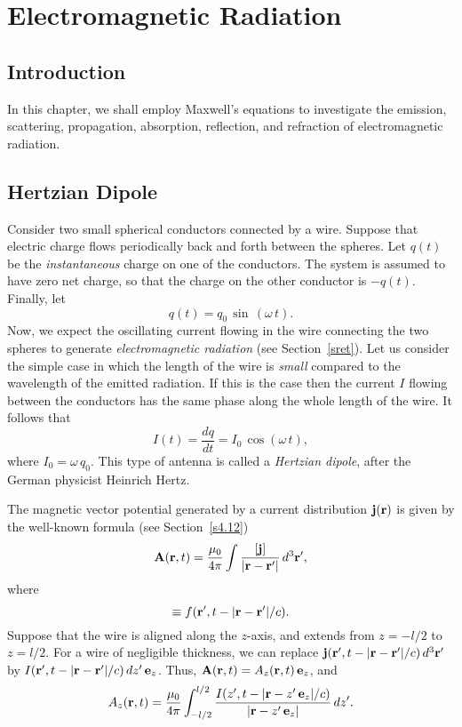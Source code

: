 \chapter{Electromagnetic Radiation}\label{waves}
\section{Introduction}
In this chapter, we shall employ Maxwell's equations to investigate
the emission, scattering, propagation, absorption, reflection, and refraction of electromagnetic radiation.

\section{Hertzian Dipole}\label{s9.1}
Consider two small spherical conductors connected by a wire. Suppose that  electric
charge flows periodically back and forth between the spheres. Let $q(t)$ be the {\em instantaneous} charge on
one of the conductors. The system is assumed to have zero net charge, so that 
the charge on the other conductor is $-q(t)$. Finally, let
\begin{equation} 
q(t) = q_0\, \sin \,(\omega\, t).
\end{equation}
Now, we expect the oscillating current flowing in the wire connecting the two spheres to
generate {\em electromagnetic radiation}\/ (see Section~\ref{sret}). Let us consider the simple
case in which the length of the wire is {\em small}\/ compared to the wavelength of the emitted
radiation. If this is the case then the current $I$ flowing between the conductors has the
same phase along the whole length of the wire. It  follows that
\begin{equation}
I(t) = \frac{dq}{dt} = I_0\, \cos(\omega\, t),
\end{equation}
where $I_0 = \omega \,q_0$. This type of antenna is called a {\em Hertzian dipole}, after
the German physicist Heinrich Hertz.

The magnetic vector potential generated by a current distribution ${\bf j}({\bf r})$ is given by
the well-known formula (see Section~\ref{s4.12})
\begin{equation}
{\bf A}({\bf r}, t) = \frac{\mu_0}{4\pi} \int \frac{[{\bf j}]}{|{\bf r} - {\bf r}'|}\,
d^3{\bf r}',
\end{equation}
where
\begin{equation}
[f] \equiv f({\bf r}', t - |{\bf r} - {\bf r}'|/c).
\end{equation}
Suppose that the wire is aligned along the $z$-axis, and extends from $z=-l/2$ to $z=l/2$. 
For a wire of negligible thickness, we can replace ${\bf  j}({\bf r}', t- |{\bf r} - {\bf r}'|/c)
\,d^3{\bf r}'$ by $I({\bf r}', t - |{\bf r} - {\bf r}'|/c)\,dz' \,{\bf e}_z$. 
Thus, ${\bf A}({\bf r}, t) = A_z({\bf r}, t)\, {\bf e}_z$, and
\begin{equation}
A_z ({\bf r}, t) = \frac{\mu_0}{4\pi} \int_{-l/2}^{l/2} 
\frac{I(z', t - |{\bf r} - z'\, {\bf e}_z |/c)}{|{\bf r} - z'\, {\bf e}_z|}\,dz'.
\end{equation}


